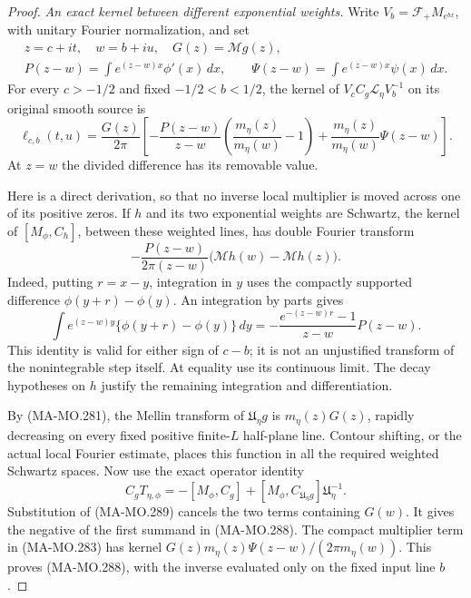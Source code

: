 \begin{proof}
\emph{An exact kernel between different exponential weights.}
Write \(V_b=\mathcal F_+M_{e^{bx}}\), with unitary Fourier
normalization, and set
\[
 \begin{gathered}
 z=c+it,\quad w=b+iu,\quad G(z)=\mathcal Mg(z),\\
 P(z-w)=\int e^{(z-w)x}\phi'(x)\,dx,\qquad
 \Psi(z-w)=\int e^{(z-w)x}\psi(x)\,dx.
 \end{gathered}
 \tag{MA-MO.287}
\]
For every \(c>-1/2\) and fixed \(-1/2<b<1/2\), the
kernel of \(V_c C_g\mathcal L_\eta V_b^{-1}\) on its
original smooth source is
\[
 \ell_{c,b}(t,u)=\frac{G(z)}{2\pi}
 \left[
 -\frac{P(z-w)}{z-w}
              \left(\frac{m_\eta(z)}{m_\eta(w)}-1\right)
       +\frac{m_\eta(z)}{m_\eta(w)}\Psi(z-w)
 \right].
 \tag{MA-MO.288}
\]
At \(z=w\) the divided difference has its removable value.

Here is a direct derivation, so that no inverse local multiplier
is moved across one of its positive zeros. If \(h\) and its
two exponential weights are Schwartz, the kernel of
\([M_\phi,C_h]\), between these weighted lines, has double
Fourier transform
\[
 -\frac{P(z-w)}{2\pi(z-w)}
              \bigl(\mathcal Mh(w)-\mathcal Mh(z)\bigr).
 \tag{MA-MO.289}
\]
Indeed, putting \(r=x-y\), integration in \(y\) uses the
compactly supported difference \(\phi(y+r)-\phi(y)\).
An integration by parts gives
\[
 \int e^{(z-w)y}\{\phi(y+r)-\phi(y)\}\,dy
       =-\frac{e^{-(z-w)r}-1}{z-w}P(z-w).
 \tag{MA-MO.290}
\]
This identity is valid for either sign of \(c-b\); it is not
an unjustified transform of the nonintegrable step itself.
At equality use its continuous limit. The decay hypotheses on
\(h\) justify the remaining integration and differentiation.

By (MA-MO.281), the Mellin transform of
\(\mathfrak U_\eta g\) is \(m_\eta(z)G(z)\), rapidly
decreasing on every fixed positive finite-\(L\) half-plane
line. Contour shifting, or the actual local Fourier estimate,
places this function in all the required weighted Schwartz
spaces. Now use the exact operator identity
\[
 C_gT_{\eta,\phi}
     =-[M_\phi,C_g]
       +[M_\phi,C_{\mathfrak U_\eta g}]
                    \mathfrak U_\eta^{-1}.
 \tag{MA-MO.291}
\]
Substitution of (MA-MO.289) cancels the two terms containing
\(G(w)\). It gives the negative of the first summand in
(MA-MO.288). The compact multiplier term in (MA-MO.283)
has kernel \(G(z)m_\eta(z)\Psi(z-w)/(2\pi m_\eta(w))\).
This proves (MA-MO.288), with the inverse evaluated only on
the fixed input line \(b\).


\end{proof}

